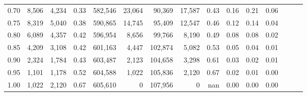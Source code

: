 \begin{tabular}{rrrrrrrrrrrrrrr}
0.70 &    8,506 &   4,234 &  0.33 &  582,546 &   23,064 &   90,369 &   17,587 &  0.43 &  0.16 &  0.21 &      0.06 \\
0.75 &    8,319 &   5,040 &  0.38 &  590,865 &   14,745 &   95,409 &   12,547 &  0.46 &  0.12 &  0.14 &      0.04 \\
0.80 &    6,089 &   4,357 &  0.42 &  596,954 &    8,656 &   99,766 &    8,190 &  0.49 &  0.08 &  0.08 &      0.02 \\
0.85 &    4,209 &   3,108 &  0.42 &  601,163 &    4,447 &  102,874 &    5,082 &  0.53 &  0.05 &  0.04 &      0.01 \\
0.90 &    2,324 &   1,784 &  0.43 &  603,487 &    2,123 &  104,658 &    3,298 &  0.61 &  0.03 &  0.02 &      0.01 \\
0.95 &    1,101 &   1,178 &  0.52 &  604,588 &    1,022 &  105,836 &    2,120 &  0.67 &  0.02 &  0.01 &      0.00 \\
1.00 &    1,022 &   2,120 &  0.67 &  605,610 &        0 &  107,956 &        0 &   nan &  0.00 &  0.00 &      0.00 \\
\bottomrule
\end{tabular}
